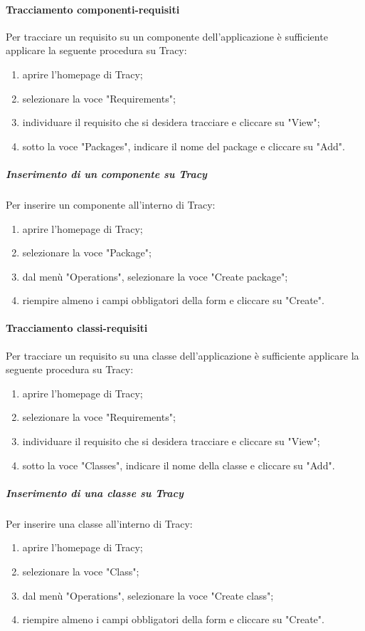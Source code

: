 \documentclass[../NormeProgetto.tex]{subfiles}
\begin{document}
			\paragraph{Tracciamento componenti-requisiti}
				Per tracciare un requisito su un componente dell'applicazione è sufficiente applicare la seguente procedura su Tracy:
				\begin{enumerate}
					\item aprire l'homepage di Tracy;
					\item selezionare la voce "Requirements";
					\item individuare il requisito che si desidera tracciare e cliccare su "View";
					\item sotto la voce "Packages", indicare il nome del package e cliccare su "Add".
				\end{enumerate}
				
				\subparagraph{Inserimento di un componente su Tracy}
					Per inserire un componente all'interno di Tracy:
					\begin{enumerate}
						\item aprire l'homepage di Tracy;
						\item selezionare la voce "Package";
						\item dal menù "Operations", selezionare la voce "Create package";
						\item riempire almeno i campi obbligatori della form e cliccare su "Create".
					\end{enumerate}
			\paragraph{Tracciamento classi-requisiti}
				Per tracciare un requisito su una classe dell'applicazione è sufficiente applicare la seguente procedura su Tracy:
				\begin{enumerate}
					\item aprire l'homepage di Tracy;
					\item selezionare la voce "Requirements";
					\item individuare il requisito che si desidera tracciare e cliccare su "View";
					\item sotto la voce "Classes", indicare il nome della classe e cliccare su "Add".
				\end{enumerate}
				\subparagraph{Inserimento di una classe su Tracy}
					Per inserire una classe all'interno di Tracy:
					\begin{enumerate}
						\item aprire l'homepage di Tracy;
						\item selezionare la voce "Class";
						\item dal menù "Operations", selezionare la voce "Create class";
						\item riempire almeno i campi obbligatori della form e cliccare su "Create".
					\end{enumerate}
\end{document}
